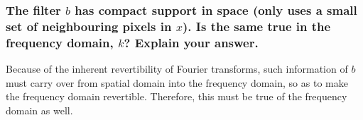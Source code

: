 
\subsubsection{\mdseries The filter $b$ has compact support in space (only
uses a small set of neighbouring pixels in $x$). Is the same true in the
frequency domain, $k$? Explain your answer.}
Because of the inherent revertibility of Fourier transforms, such information
of $b$ must carry over from spatial domain into the frequency domain, so as
to make the frequency domain revertible. Therefore, this must be true of the
frequency domain as well.
